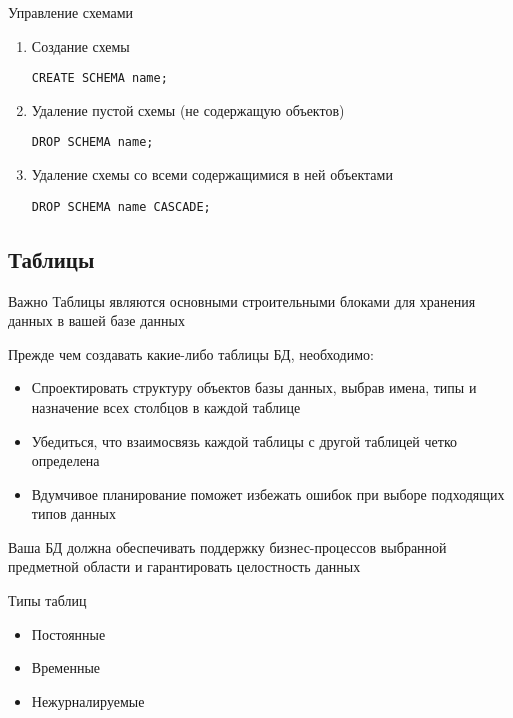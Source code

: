 \documentclass[12pt]{article}
\begin{document}
\begin{Example}{Управление схемами}
    \begin{enumerate}
        \item Создание схемы 
        
\begin{lstlisting}
CREATE SCHEMA name;
\end{lstlisting}

        \item Удаление пустой схемы (не содержащую объектов)
        
\begin{lstlisting}
DROP SCHEMA name;
\end{lstlisting}

        \item Удаление схемы со всеми содержащимися в ней объектами 

\begin{lstlisting}
DROP SCHEMA name CASCADE;
\end{lstlisting}
    \end{enumerate}
\end{Example}

\newpage 

\subsection{Таблицы}

\begin{Remark}{Важно}
    Таблицы являются основными строительными блоками для хранения данных в вашей базе данных 

    Прежде чем создавать какие-либо таблицы БД, необходимо: 

    \begin{itemize}
        \item Спроектировать структуру объектов базы данных, выбрав имена, типы и назначение всех столбцов в каждой таблице 
        \item Убедиться, что взаимосвязь каждой таблицы с другой таблицей четко определена 
        \item Вдумчивое планирование поможет избежать ошибок при выборе подходящих типов данных 
    \end{itemize}

    Ваша БД должна обеспечивать поддержку бизнес-процессов выбранной предметной области и гарантировать целостность данных 
\end{Remark}

\begin{nota}{Типы таблиц}
    \begin{itemize}
        \item Постоянные 
        \item Временные 
        \item Нежурналируемые 
    \end{itemize}
\end{nota}
\end{document}
